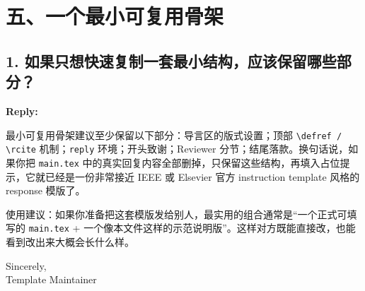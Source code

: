 \documentclass[11pt,a4paper,fontset=none]{ctexart}
\newenvironment{reply}{%
  \par\vspace{2pt}%
  \color{replyblue}%
  \noindent\textbf{Reply:} %
  \ignorespaces
}{\par\vspace{2pt}}
\begin{document}
\section*{五、一个最小可复用骨架}

\subsection*{1. 如果只想快速复制一套最小结构，应该保留哪些部分？}

\begin{reply}
最小可复用骨架建议至少保留以下部分：导言区的版式设置；顶部 \texttt{\textbackslash defref / \textbackslash rcite} 机制；\texttt{reply} 环境；开头致谢；Reviewer 分节；结尾落款。换句话说，如果你把 \texttt{main.tex} 中的真实回复内容全部删掉，只保留这些结构，再填入占位提示，它就已经是一份非常接近 IEEE 或 Elsevier 官方 instruction template 风格的 response 模版了。
\end{reply}

\bigskip
\noindent 使用建议：如果你准备把这套模版发给别人，最实用的组合通常是“一个正式可填写的 \texttt{main.tex} + 一个像本文件这样的示范说明版”。这样对方既能直接改，也能看到改出来大概会长什么样。

\bigskip
\noindent Sincerely,\\[1.5em]
\noindent Template Maintainer
\end{document}
